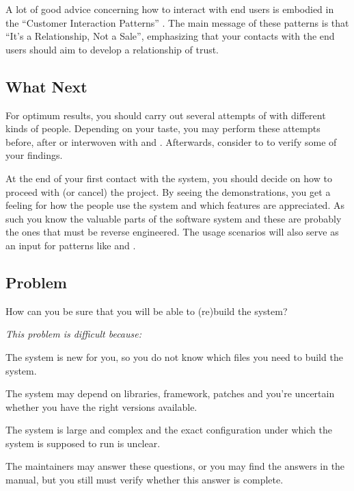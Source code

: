\documentclass[a4paper,10pt,twoside]{book}
\begin{document}
A lot of good advice concerning how to interact with end users is embodied in the ``Customer Interaction Patterns'' \cite{Risi00a}. The main message of these patterns is that ``It's a Relationship, Not a Sale'', emphasizing that your contacts with the end users should aim to develop a relationship of trust.

\subsection*{What Next}

For optimum results, you should carry out several attempts of  with different kinds of people. Depending on your taste, you may perform these attempts before, after or interwoven with  and . Afterwards, consider to  to verify some of your findings. 

At the end of your first contact with the system, you should decide on how to proceed with (or cancel) the project. By seeing the demonstrations, you get a feeling for how the people use the system and which features are appreciated. As such you know the valuable parts of the software system and these are probably the ones that must be reverse engineered. The usage scenarios will also serve as an input for patterns like  and .



\subsection*{Problem}

How can you be sure that you will be able to (re)build the system?

\emph{This problem is difficult because:}

\begin{bulletlist}
  \item The system is new for you, so you do not know which files you need to build the system.

  \item The system may depend on libraries, framework, patches and you're uncertain whether you have the right versions available.

  \item The system is large and complex and the exact configuration under which the system is supposed to run is unclear.

  \item The maintainers may answer these questions, or you may find the answers in the manual, but you still must verify whether this answer is complete.
\end{bulletlist}
\end{document}

